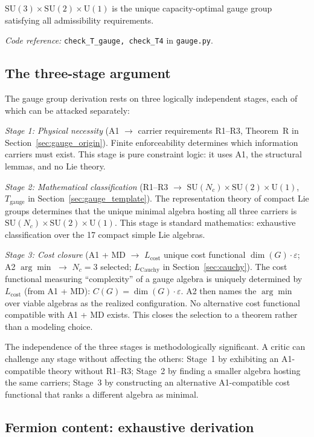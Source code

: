 \documentclass[11pt]{article}
\newcommand{\coderef}[2]{\smallskip\noindent\textit{Code reference:} \texttt{#1} in \texttt{#2}.}
\newcommand{\SU}{\mathrm{SU}}
\newcommand{\U}{\mathrm{U}}
\begin{document}
$\SU(3) \times \SU(2) \times \U(1)$ is the unique capacity-optimal gauge group satisfying all admissibility requirements.

\coderef{check\_T\_gauge, check\_T4}{gauge.py}

\subsection{The three-stage argument}

The gauge group derivation rests on three logically independent stages, each of which can be attacked separately:

\textit{Stage 1: Physical necessity} (A1 $\to$ carrier requirements R1--R3, Theorem~R in Section~\ref{sec:gauge_origin}).  Finite enforceability determines which information carriers must exist.  This stage is pure constraint logic: it uses A1, the structural lemmas, and no Lie theory.

\textit{Stage 2: Mathematical classification} (R1--R3 $\to$ $\SU(N_c) \times \SU(2) \times \U(1)$, $T_{\mathrm{gauge}}$ in Section~\ref{sec:gauge_template}).  The representation theory of compact Lie groups determines that the unique minimal algebra hosting all three carriers is $\SU(N_c) \times \SU(2) \times \U(1)$.  This stage is standard mathematics: exhaustive classification over the 17 compact simple Lie algebras.

\textit{Stage 3: Cost closure} (A1 + MD $\to$ $L_{\mathrm{cost}}$ unique cost functional $\dim(G) \cdot \varepsilon$; A2 $\arg\min$ $\to$ $N_c = 3$ selected; $L_{\mathrm{Cauchy}}$ in Section~\ref{sec:cauchy}).  The cost functional measuring ``complexity'' of a gauge algebra is uniquely determined by $L_{\mathrm{cost}}$ (from A1 + MD): $C(G) = \dim(G) \cdot \varepsilon$.  A2 then names the $\arg\min$ over viable algebras as the realized configuration.  No alternative cost functional compatible with A1 + MD exists.  This closes the selection to a theorem rather than a modeling choice.

The independence of the three stages is methodologically significant.  A critic can challenge any stage without affecting the others: Stage~1 by exhibiting an A1-compatible theory without R1--R3; Stage~2 by finding a smaller algebra hosting the same carriers; Stage~3 by constructing an alternative A1-compatible cost functional that ranks a different algebra as minimal.

\subsection{Fermion content: exhaustive derivation}
\end{document}
